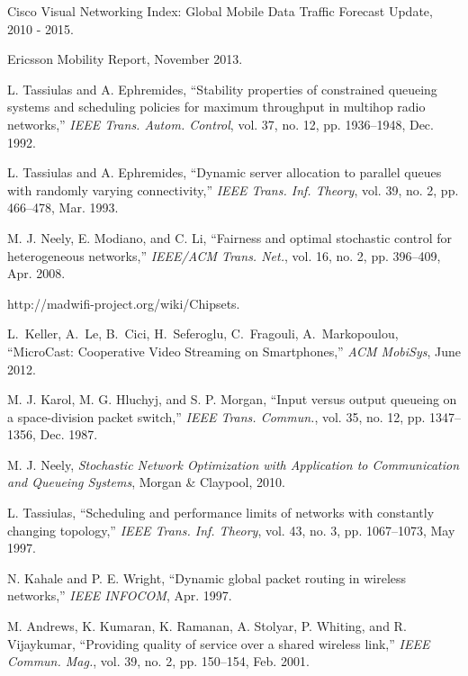 \documentclass[conference]{IEEEtran}
\begin{document}

\begin{thebibliography}{}

 Cisco Visual Networking Index: Global Mobile Data Traffic Forecast Update, 2010 - 2015.

 Ericsson Mobility Report, November 2013.

 L. Tassiulas and A. Ephremides, ``Stability properties of constrained queueing systems and scheduling policies for maximum throughput in multihop radio networks,'' {\em IEEE Trans. Autom. Control}, vol. 37, no. 12, pp. 1936--1948, Dec. 1992.

 L. Tassiulas and A. Ephremides, ``Dynamic server allocation to parallel queues with randomly varying connectivity,'' {\em IEEE Trans. Inf. Theory}, vol. 39, no. 2, pp. 466--478, Mar. 1993.

 M. J. Neely, E. Modiano, and C. Li, ``Fairness and optimal stochastic control for heterogeneous networks,'' {\em IEEE/ACM Trans. Net.}, vol. 16, no. 2, pp. 396--409, Apr. 2008.

 http://madwifi-project.org/wiki/Chipsets. 

 L.~Keller, A.~Le, B.~Cici, H.~Seferoglu, C.~Fragouli, A.~Markopoulou, ``MicroCast: Cooperative Video Streaming on Smartphones,'' {\em ACM MobiSys}, June 2012.



 M. J. Karol, M. G. Hluchyj, and S. P. Morgan, ``Input versus output queueing on a space-division packet switch,'' {\em IEEE Trans. Commun.}, vol. 35, no. 12, pp. 1347--1356, Dec. 1987.

 M. J. Neely, \emph{Stochastic Network Optimization with Application to Communication and Queueing Systems}, Morgan \& Claypool, 2010.

 L. Tassiulas, ``Scheduling and performance limits of networks with constantly changing topology,'' {\em IEEE Trans. Inf. Theory}, vol. 43, no. 3, pp. 1067--1073, May 1997.

 N. Kahale and P. E. Wright, ``Dynamic global packet routing in wireless networks,'' {\em IEEE INFOCOM}, Apr. 1997.

 M. Andrews, K. Kumaran, K. Ramanan, A. Stolyar, P. Whiting, and R. Vijaykumar, ``Providing quality of service over a shared wireless link,'' {\em IEEE Commun. Mag.}, vol. 39, no. 2, pp. 150--154, Feb. 2001.


\end{thebibliography}
\end{document}
